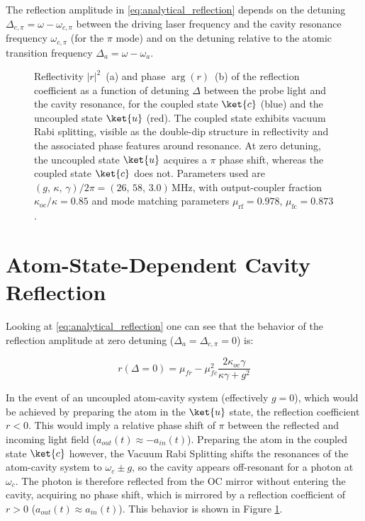 The reflection amplitude in \eqref{eq:analytical_reflection} depends on the detuning $\Delta_{c,\pi} = \omega - \omega_{c,\pi}$ between the driving laser frequency and the cavity resonance frequency $\omega_{c,\pi}$ (for the $\pi$ mode) and on the detuning relative to the atomic transition frequency $\Delta_{a} = \omega-\omega_a$.\\

\begin{figure}
	\centering
	
	\caption{Reflectivity $|r|^2$~(a) and phase $\arg(r)$~(b) of the reflection coefficient as a function of detuning $\Delta$ between the probe light and the cavity resonance, for the coupled state $\ket{c}$ (blue) and the uncoupled state $\ket{u}$ (red). The coupled state exhibits vacuum Rabi splitting, visible as the double-dip structure in reflectivity and the associated phase features around resonance. At zero detuning, the uncoupled state $\ket{u}$ acquires a $\pi$ phase shift, whereas the coupled state $\ket{c}$ does not. Parameters used are $(g,\,\kappa,\,\gamma)/2\pi = (26,\,58,\,3.0)$\,\si{\mega\hertz}, with output-coupler fraction $\kappa_\text{oc}/\kappa = 0.85$ and mode matching parameters $\mu_\text{rf} = 0.978$, $\mu_\text{fc} = 0.873$.}
	\label{fig:reflection_phase_spectrum}
\end{figure}

\section{Atom-State-Dependent Cavity Reflection}

Looking at \eqref{eq:analytical_reflection} one can see that the behavior of the reflection amplitude at zero detuning ($\Delta_a=\Delta_{c,\pi}=0$) is:

\begin{equation}
	r(\Delta = 0) = \mu_{fr} - \mu_{fc}^2\frac{2\kappa_{oc}\gamma}{\kappa\gamma + g^2}
	\label{eq:analytical_reflection_zero_detuning}
\end{equation}

In the event of an uncoupled atom-cavity system (effectively $g=0$), which would be achieved by preparing the atom in the $\ket{u}$ state, the reflection coefficient $r<0$. This would imply a relative phase shift of $\pi$ between the reflected and incoming light field ($a_{out}(t) \approx -a_{in}(t)$). Preparing the atom in the coupled state $\ket{c}$ however, the Vacuum Rabi Splitting shifts the resonances of the atom-cavity system to $\omega_c\pm g$, so the cavity appears off-resonant for a photon at $\omega_c$. The photon is therefore reflected from the OC mirror without entering the cavity, acquiring no phase shift, which is mirrored by a reflection coefficient of $r>0$ ($a_{out}(t) \approx a_{in}(t)$). This behavior is shown in Figure \ref{fig:reflection_phase_spectrum}.

